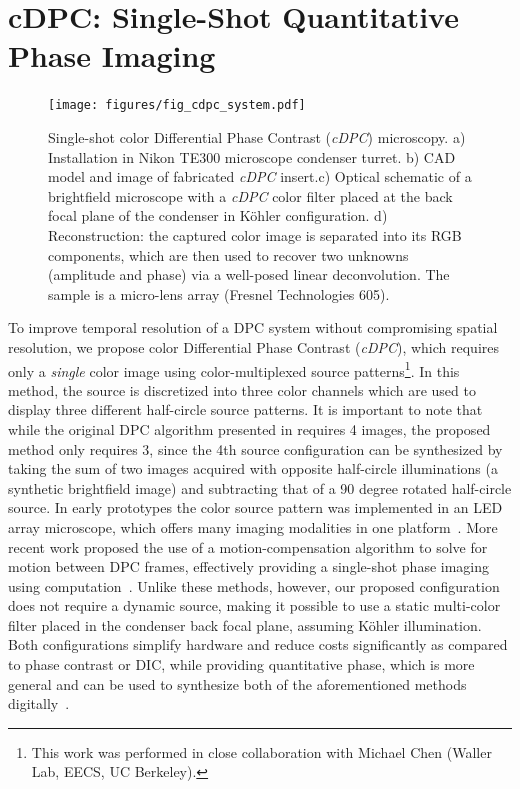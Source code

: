 \section{cDPC: Single-Shot Quantitative Phase Imaging}\label{sec:phase:cdpc}

\begin{figure}[tbh]
\centering
\texttt{[image: figures/fig\_cdpc\_system.pdf]}
\caption{\label{fig:dpc_cdpchardware}
Single-shot color Differential Phase Contrast (\textit{cDPC}) microscopy. a) Installation in Nikon TE300 microscope condenser turret. b) CAD model and image of fabricated \textit{cDPC} insert.c) Optical schematic of a brightfield microscope with a \textit{cDPC} color filter placed at the back focal plane of the condenser in K\"{o}hler configuration. d) Reconstruction: the captured color image is separated into its RGB components, which are then used to recover two unknowns (amplitude and phase) via a well-posed linear deconvolution. The sample is a micro-lens array (Fresnel Technologies 605). }
\end{figure}

To improve temporal resolution of a DPC system without compromising spatial resolution, we propose color Differential Phase Contrast (\textit{cDPC}), which requires only a \emph{single} color image using color-multiplexed source patterns\footnote{This work was performed in close collaboration with Michael Chen (Waller Lab, EECS, UC Berkeley).}. In this method, the source is discretized into three color channels which are used to display three different half-circle source patterns. It is important to note that while the original DPC algorithm presented in \cite{tian2015quantitative} requires 4 images, the proposed method only requires 3, since the 4th source configuration can be synthesized by taking the sum of two images acquired with opposite half-circle illuminations (a synthetic brightfield image) and subtracting that of a 90 degree rotated half-circle source. In early prototypes the color source pattern was implemented in an LED array microscope, which offers many imaging modalities in one platform~\cite{Tian14,zijiMulti,tian2015quantitative,Ma:15,phillips2015multi, Zheng2011, Zheng2013}. More recent work proposed the use of a motion-compensation algorithm to solve for motion between DPC frames, effectively providing a single-shot phase imaging using computation~\cite{kellman2018motion}. Unlike these methods, however, our proposed configuration does not require a dynamic source, making it possible to use a static multi-color filter placed in the condenser back focal plane, assuming K\"{o}hler illumination. Both configurations simplify hardware and reduce costs significantly as compared to phase contrast or DIC, while providing quantitative phase, which is more general and can be used to synthesize both of the aforementioned methods digitally~\cite{JMI:JMI1027}.

